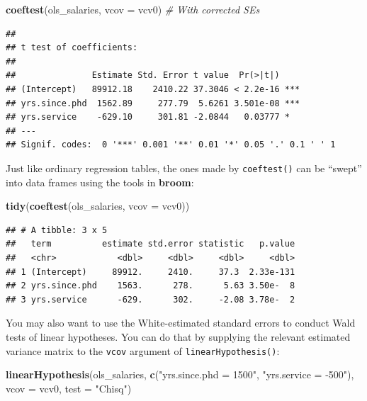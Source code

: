 \documentclass[12pt,oneside,openany]{book}
\newenvironment{Shaded}{\begin{snugshade}}{\end{snugshade}}
\newcommand{\KeywordTok}[1]{\textcolor[rgb]{0.13,0.29,0.53}{\textbf{#1}}}
\newcommand{\DataTypeTok}[1]{\textcolor[rgb]{0.13,0.29,0.53}{#1}}
\newcommand{\StringTok}[1]{\textcolor[rgb]{0.31,0.60,0.02}{#1}}
\newcommand{\CommentTok}[1]{\textcolor[rgb]{0.56,0.35,0.01}{\textit{#1}}}
\newcommand{\NormalTok}[1]{#1}
\begin{document}
\begin{Shaded}
\begin{Highlighting}[]
\KeywordTok{coeftest}\NormalTok{(ols_salaries, }\DataTypeTok{vcov =}\NormalTok{ vcv0)  }\CommentTok{# With corrected SEs}
\end{Highlighting}
\end{Shaded}

\begin{verbatim}
## 
## t test of coefficients:
## 
##               Estimate Std. Error t value  Pr(>|t|)    
## (Intercept)   89912.18    2410.22 37.3046 < 2.2e-16 ***
## yrs.since.phd  1562.89     277.79  5.6261 3.501e-08 ***
## yrs.service    -629.10     301.81 -2.0844   0.03777 *  
## ---
## Signif. codes:  0 '***' 0.001 '**' 0.01 '*' 0.05 '.' 0.1 ' ' 1
\end{verbatim}

Just like ordinary regression tables, the ones made by
\texttt{coeftest()} can be ``swept'' into data frames using the tools in
\textbf{broom}:

\begin{Shaded}
\begin{Highlighting}[]
\KeywordTok{tidy}\NormalTok{(}\KeywordTok{coeftest}\NormalTok{(ols_salaries, }\DataTypeTok{vcov =}\NormalTok{ vcv0))}
\end{Highlighting}
\end{Shaded}

\begin{verbatim}
## # A tibble: 3 x 5
##   term          estimate std.error statistic   p.value
##   <chr>            <dbl>     <dbl>     <dbl>     <dbl>
## 1 (Intercept)     89912.     2410.     37.3  2.33e-131
## 2 yrs.since.phd    1563.      278.      5.63 3.50e-  8
## 3 yrs.service      -629.      302.     -2.08 3.78e-  2
\end{verbatim}

You may also want to use the White-estimated standard errors to conduct
Wald tests of linear hypotheses. You can do that by supplying the
relevant estimated variance matrix to the \texttt{vcov} argument of
\texttt{linearHypothesis()}:

\begin{Shaded}
\begin{Highlighting}[]
\KeywordTok{linearHypothesis}\NormalTok{(ols_salaries,}
                 \KeywordTok{c}\NormalTok{(}\StringTok{"yrs.since.phd = 1500"}\NormalTok{, }\StringTok{"yrs.service = -500"}\NormalTok{),}
                 \DataTypeTok{vcov =}\NormalTok{ vcv0,}
                 \DataTypeTok{test =} \StringTok{"Chisq"}\NormalTok{)}
\end{Highlighting}
\end{Shaded}
\end{document}
